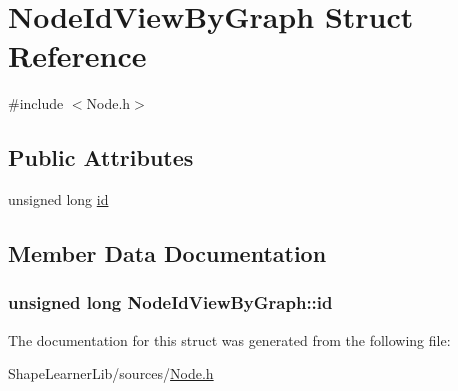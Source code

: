 \hypertarget{struct_node_id_view_by_graph}{}\section{Node\+Id\+View\+By\+Graph Struct Reference}
\label{struct_node_id_view_by_graph}


{\ttfamily \#include $<$Node.\+h$>$}

\subsection*{Public Attributes}
\begin{DoxyCompactItemize}
\item 
unsigned long \hyperlink{struct_node_id_view_by_graph_ad1e264270aaf56f489a36259d79b7cef}{id}
\end{DoxyCompactItemize}


\subsection{Member Data Documentation}
\hypertarget{struct_node_id_view_by_graph_ad1e264270aaf56f489a36259d79b7cef}{}
\subsubsection[{id}]{\setlength{\rightskip}{0pt plus 5cm}unsigned long Node\+Id\+View\+By\+Graph\+::id}\label{struct_node_id_view_by_graph_ad1e264270aaf56f489a36259d79b7cef}


The documentation for this struct was generated from the following file\+:\begin{DoxyCompactItemize}
\item 
Shape\+Learner\+Lib/sources/\hyperlink{_node_8h}{Node.\+h}\end{DoxyCompactItemize}
